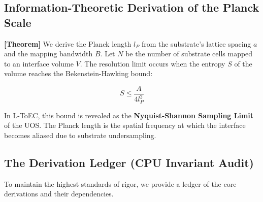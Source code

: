 \documentclass[11pt,titlepage]{article}
\newcommand{\tagtheo}{\textcolor{green!60!black}{\textbf{[Theorem]}} }
\begin{document}
\subsection{Information-Theoretic Derivation of the Planck Scale}
\tagtheo We derive the Planck length $l_P$ from the substrate's lattice spacing $a$ and the mapping bandwidth $B$. Let $N$ be the number of substrate cells mapped to an interface volume $V$. The resolution limit occurs when the entropy $S$ of the volume reaches the Bekenstein-Hawking bound:

\begin{equation}
S \le \frac{A}{4l_P^2}
\end{equation}

In L-ToEC, this bound is revealed as the \textbf{Nyquist-Shannon Sampling Limit} of the UOS. The Planck length is the spatial frequency at which the interface becomes aliased due to substrate undersampling.

\subsection{The Derivation Ledger (CPU Invariant Audit)}
To maintain the highest standards of rigor, we provide a ledger of the core derivations and their dependencies.
\end{document}
